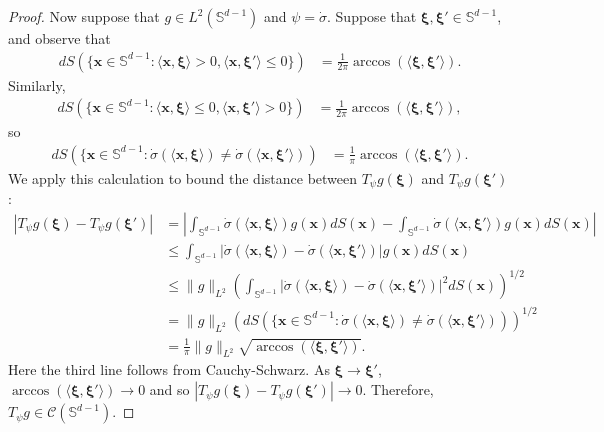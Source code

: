\documentclass{article}
\theoremstyle{definition}
\newcommand{\mc}{\mathcal}
\renewcommand{\S}{\mathbb{S}}
\def\vx{{\bm{x}}}
\begin{document}
\begin{proof}
    Now suppose that $g \in L^2(\S^{d -1})$ and $\psi = \dot{\sigma}$. Suppose that $\bm{\xi}, \bm{\xi'} \in \S^{d -1}$, and observe that
    \begin{align*}
        dS(\{\vx \in \S^{d - 1}: \langle \vx, \bm{\xi} \rangle > 0, \langle \vx, \bm{\xi}'\rangle \leq 0\}) &= \frac{1}{2 \pi}\arccos(\langle \bm{\xi}, \bm{\xi}' \rangle).
    \end{align*}
    Similarly,
        \begin{align*}
        dS(\{\vx \in \S^{d - 1}: \langle \vx, \bm{\xi} \rangle \leq 0, \langle \vx, \bm{\xi}'\rangle > 0\}) &= \frac{1}{2 \pi}\arccos(\langle \bm{\xi}, \bm{\xi}' \rangle),
    \end{align*}
    so
        \begin{align*}
        dS(\{\vx \in \S^{d - 1}: \dot{\sigma}(\langle \vx, \bm{\xi} \rangle)  \neq \dot{\sigma}(\langle \vx, \bm{\xi}' \rangle)   ) &= \frac{1}{ \pi}\arccos(\langle \bm{\xi}, \bm{\xi}' \rangle).
    \end{align*}
    We apply this calculation to bound the distance between $T_{\psi}g(\bm{\xi})$ and $T_{\psi}g(\bm{\xi'})$: 
    \begin{align*}
        |T_{\psi}g(\bm{\xi}) - T_{\psi}g(\bm{\xi'})|&= \left|\int_{\S^{d-1}} \dot{\sigma}(\langle \vx, \bm{\xi} \rangle) g(\vx)dS(\vx) - \int_{\S^{d-1}} \dot{\sigma}(\langle \vx, \bm{\xi}' \rangle) g(\vx)dS(\vx) \right|\\
        &\leq \int_{\S^{d-1}}|\dot{\sigma}(\langle \vx, \bm{\xi} \rangle) - \dot{\sigma}(\langle \vx, \bm{\xi}' \rangle)|g(\vx) dS(\vx)\\
        &\leq \|g\|_{L^{2}}\left(\int_{\S^{d-1}}|\dot{\sigma}(\langle \vx, \bm{\xi} \rangle) - \dot{\sigma}(\langle \vx, \bm{\xi}' \rangle)|^2 dS(\vx)\right)^{1/2}\\
        &= \|g\|_{L^2} \left(dS(\{\vx \in \S^{d - 1}: \dot{\sigma}(\langle \vx, \bm{\xi} \rangle) \neq \dot{\sigma}(\langle \vx, \bm{\xi}' \rangle)) \right)^{1/2}\\
        &= \frac{1}{\pi}\|g\|_{L^2}\sqrt{\arccos(\langle \bm{\xi}, \bm{\xi'} \rangle)}.
    \end{align*}
    Here the third line follows from Cauchy-Schwarz. As $\bm{\xi} \to \bm{\xi}'$, $\arccos(\langle \bm{\xi}, \bm{\xi}' \rangle) \to 0$ and so $|T_{\psi}g(\bm{\xi}) - T_{\psi}g(\bm{\xi'})| \to 0$. Therefore, $T_{\psi}g \in \mc{C}(\S^{d-1})$.


\end{proof}
\end{document}
